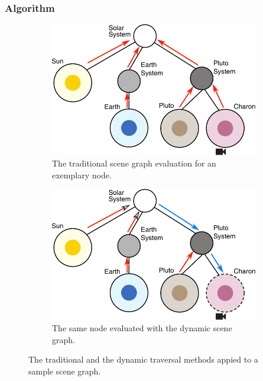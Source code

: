 \subsubsection{Algorithm} \label{contributions:astro:dsg:algorithm}
\begin{figure}
\centering
\begin{subfigure}[b]{0.4\textwidth}
    \includegraphics[width=\abfboximagewidth]{figures/contributions/dsg/scenegraph_traditional.pdf}
    \caption{The traditional scene graph evaluation for an exemplary node.}
    \label{contributions:astro:dsg:sceengraph:traditional}
\end{subfigure}
\hspace*{1cm}
\begin{subfigure}[b]{0.4\textwidth}
    \includegraphics[width=\abfboximagewidth]{figures/contributions/dsg/scenegraph_dynamic.pdf}
    \caption{The same node evaluated with the dynamic scene graph.}
    \label{contributions:astro:dsg:sceengraph:dsg}
\end{subfigure}
\caption{The traditional and the dynamic traversal methods appied to a sample scene graph.}
\label{contributions:astro:dsg:scenegraph}
\end{figure}

